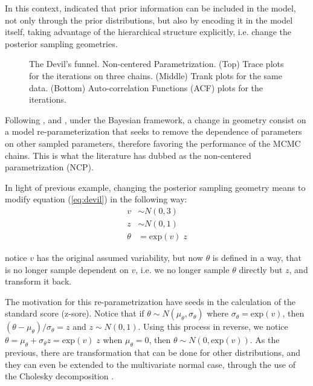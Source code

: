 In this context, \citet{Betancourt_et_al_2013} indicated that prior information can be included in the model, not only through the prior distributions, but also by encoding it in the model itself, taking advantage of the hierarchical structure explicitly, i.e. change the posterior sampling geometries. 
%
\begin{figure}[h]
	\centering
	\begin{subfigure}
		\texttt{[image: 3\_trace\_NC]}
	\end{subfigure}
	\begin{subfigure}
		\texttt{[image: 3\_trank\_NC]}
	\end{subfigure}
	\begin{subfigure}
		\texttt{[image: 3\_acf\_NC]}
	\end{subfigure}
	\caption[The Devil's funnel. Non-centered Parametrization.]%
	{The Devil's funnel. Non-centered Parametrization. (Top) Trace plots for the iterations on three chains. (Middle) Trank plots for the same data. (Bottom) Auto-correlation Functions (ACF) plots for the iterations.}
	\label{fig:devil_NC}
\end{figure}

Following \citet{Papaspiliopoulos_et_al_2003, Papaspiliopoulos_et_al_2007}, and \citet{Betancourt_et_al_2013}, under the Bayesian framework, a change in geometry consist on a model re-parameterization that seeks to remove the dependence of parameters on other sampled parameters, therefore favoring the performance of the MCMC chains. This is what the literature has dubbed as the non-centered parametrization (NCP).

In light of previous example, changing the posterior sampling geometry means to modify equation (\ref{eq:devil}) in the following way:
%
\begin{equation} \label{eq:devil_NC}
	\begin{split}	
		v &\sim N(0, 3) \\
		z &\sim N(0, 1) \\
		\theta &= \text{exp}(v) \; z
	\end{split}
\end{equation}

\noindent notice $v$ has the original assumed variability, but now $\theta$ is defined in a way, that is no longer sample dependent on $v$, i.e. we no longer sample $\theta$ directly but $z$, and transform it back.

The motivation for this re-parametrization have seeds in the calculation of the standard score (z-sore). Notice that if $\theta \sim N(\mu_{\theta}, \sigma_{\theta})$ where $\sigma_{\theta} = \text{exp}(v)$, then $(\theta - \mu_{\theta})/\sigma_{\theta} = z$ and $z \sim N(0,1)$. Using this process in reverse, we notice $\theta = \mu_{\theta} + \sigma_{\theta} z = \text{exp}(v) \; z$ when $\mu_{\theta}=0$, then $\theta \sim N(0, \text{exp}(v))$. As the previous, there are transformation that can be done for other distributions, and they can even be extended to the multivariate normal case, through the use of the Cholesky decomposition \cite{McElreath_2020}.

